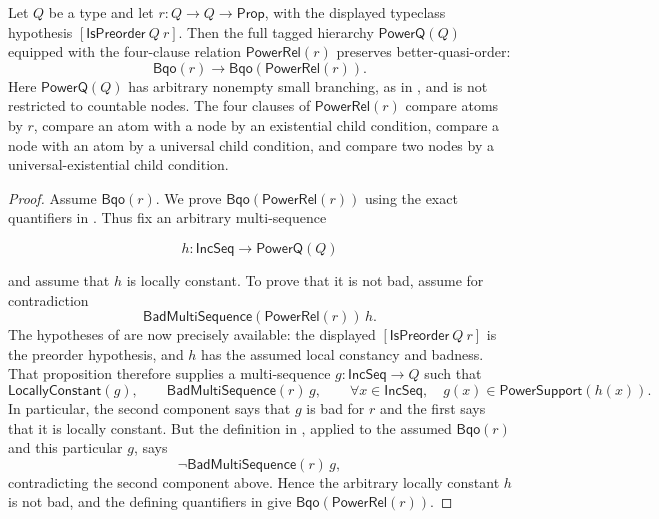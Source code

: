 \begin{corollary}
Let $Q$ be a type and let $r:Q\to Q\to\mathsf{Prop}$, with the displayed
typeclass hypothesis $[\mathsf{IsPreorder}\ Q\ r]$.  Then the full tagged
hierarchy $\mathsf{PowerQ}(Q)$ equipped with the four-clause relation
$\mathsf{PowerRel}(r)$ preserves better-quasi-order:
\[
\mathsf{Bqo}(r)\longrightarrow
\mathsf{Bqo}(\mathsf{PowerRel}(r)).
\]
Here $\mathsf{PowerQ}(Q)$ has arbitrary nonempty small branching, as in
, and is not restricted to countable nodes.  The four
clauses of $\mathsf{PowerRel}(r)$ compare atoms by $r$, compare an atom with
a node by an existential child condition, compare a node with an atom by a
universal child condition, and compare two nodes by a universal-existential
child condition.
\end{corollary}
\begin{proof}
Assume $\mathsf{Bqo}(r)$.  We prove
$\mathsf{Bqo}(\mathsf{PowerRel}(r))$ using the exact quantifiers in
.  Thus fix an arbitrary multi-sequence

\[
h:\mathsf{IncSeq}\to\mathsf{PowerQ}(Q)
\]

and assume that $h$ is locally constant.  To prove that it is not bad,
assume for contradiction
\[
\mathsf{BadMultiSequence}(\mathsf{PowerRel}(r))\,h.
\]
The hypotheses of  are now precisely available:
the displayed $[\mathsf{IsPreorder}\ Q\ r]$ is the preorder hypothesis,
and $h$ has the assumed local constancy and badness.  That proposition
therefore supplies a multi-sequence $g:\mathsf{IncSeq}\to Q$ such that
\[
\mathsf{LocallyConstant}(g),\qquad
\mathsf{BadMultiSequence}(r)\,g,
\qquad
\forall x\in\mathsf{IncSeq},\quad
g(x)\in\mathsf{PowerSupport}(h(x)).
\]
In particular, the second component says that $g$ is bad for $r$ and the
first says that it is locally constant.  But the definition in
, applied to the assumed $\mathsf{Bqo}(r)$ and this particular
$g$, says
\[
\neg\mathsf{BadMultiSequence}(r)\,g,
\]
contradicting the second component above.  Hence the arbitrary locally
constant $h$ is not bad, and the defining quantifiers in 
give $\mathsf{Bqo}(\mathsf{PowerRel}(r))$.
\end{proof}
